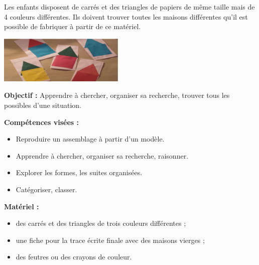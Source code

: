 \begin{exercice*} %
\begin{minipage}{8cm}
   Les enfants disposent de carrés et des triangles de papiers de même taille mais de 4 couleurs différentes. Ils doivent trouver toutes les maisons différentes qu’il est possible de fabriquer à partir de ce matériel.
\end{minipage}
\hspace*{1cm}
\begin{minipage}{6cm}
   \includegraphics[width=6cm]{Nombres_et_calculs_did/Images/Num2_activites_maisons}
\end{minipage}

\bigskip

{\bf Objectif :} Apprendre à chercher, organiser sa recherche, trouver tous les possibles d’une situation.

\medskip

{\bf Compétences visées :}
\begin{itemize}
   \item Reproduire un assemblage à partir d’un modèle.
   \item Apprendre à chercher, organiser sa recherche, raisonner.
   \item Explorer les formes, les suites organisées.
   \item Catégoriser, classer.
\end{itemize}

\medskip

{\bf Matériel :}
\begin{itemize} 
    \item des carrés et des triangles de trois couleurs différentes ;
    \item une fiche pour la trace écrite finale avec des maisons vierges ;
    \item des feutres ou des crayons de couleur.
\end{itemize}

\medskip


\end{exercice*}
